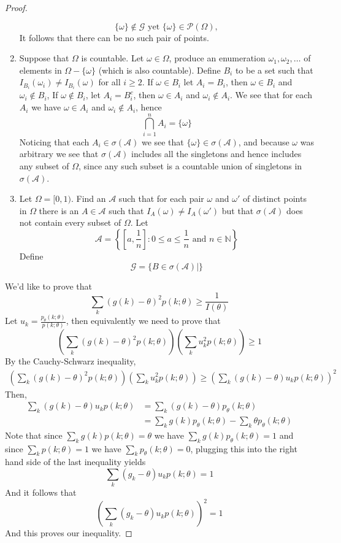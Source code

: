 \documentclass[12pt]{article}
\newcommand{\N}{\mathbb{N}}
\newcommand{\A}{\mathcal{A}}
\newcommand{\G}{\mathcal{G}}
\newcommand{\om}{\omega}
\newcommand{\Om}{\Omega}
\newcommand{\mc}{\mathcal}
\begin{document}
\begin{proof}
\begin{enumerate}
        \[ \{ \om \} \notin \G \text { yet } \{ \om \} \in \mc P (\Om), \]
        It follows that there can be no such pair of points.
        \item Suppose that $\Om$ is countable. Let $\om \in \Om$, produce an enumeration $\om_1, \om_2, \ldots$ of elements in $\Om - \{ \om \}$ (which is also countable). Define $B_{i}$ to be a set such that $I_{B_i} (\om_i) \neq I_{B_i} (\om)$ for all $i \geq 2$. If $\om \in B_i$ let $A_i = B_i$, then $\om \in B_i$ and $\om_i \notin B_i$, If $\om \notin B_i$, let $A_i = B_i^{c}$, then $\om \in A_i$ and $\om_i \notin A_i$. We see that for each $A_{i}$ we have $\om \in A_i$ and $\om_i \notin A_i$, hence
        \[ \bigcap_{i=1}^{n} A_i = \{ \om \} \]
        Noticing that each $A_i \in \sigma (\A)$ we see that $\{ \om \} \in \sigma (\A)$, and because $\om$ was arbitrary we see that $\sigma (\A)$ includes all the singletons and hence includes any subset of $\Om$, since any such subset is a countable union of singletons in $\sigma (\A)$. 
        \item Let $\Om = [0, 1)$. Find an $\A$ such that for each pair $\om$ and $\om'$ of distinct points in $\Om$ there is an $A \in \A$ such that $I_A (\om) \neq I_A (\om')$ but that $\sigma (\A)$ does not contain every subset of $\Om$. Let 
        \[ \A = \left \{ \left [a, \frac{1}{n} \right] : 0 \leq a \leq \frac{1}{n} \text { and } n \in \N \right \} \]
        Define
        \[ \G = \{ B \in \sigma (\A) \mid \} \]
    \end{enumerate}
    
    We'd like to prove that
    \[ \sum_{k} (g(k) - \theta)^2 p(k; \theta) \geq \frac{1}{I(\theta)} \]
    Let $u_k = \frac{p_{\theta} (k; \theta)}{p(k; \theta)}$, then equivalently we need to prove that
    \[ \left (\sum_{k} (g(k) - \theta)^2 p(k; \theta) \right ) \left (\sum_k u_k^2 p(k; \theta) \right ) \geq 1 \]
    By the Cauchy-Schwarz inequality,
    \begin{align*}
        \left (\sum_{k} (g(k) - \theta)^2 p(k; \theta) \right ) \left (\sum_k u_k^2 p(k; \theta) \right ) \geq \left (\sum_{k} (g(k) - \theta) u_k p(k; \theta) \right)^2
    \end{align*}
    Then,
    \begin{align*}
        \sum_{k} (g(k) - \theta) u_k p(k; \theta) &= \sum_{k} (g(k) - \theta) p_{\theta} (k; \theta) \\
        &= \sum_k g(k) p_{\theta} (k; \theta) - \sum_{k} \theta p_{\theta} (k; \theta)
    \end{align*}
    Note that since $\sum_k g(k) p(k; \theta) = \theta$ we have $\sum_k g(k) p_\theta (k;\theta) = 1$ and since $\sum_k p(k; \theta) = 1$ we have $\sum_k p_{\theta} (k; \theta) = 0$, plugging this into the right hand side of the last inequality yields
    \[ \sum_k (g_k - \theta) u_k p(k;\theta) = 1 \]
    And it follows that 
    \[ \left (\sum_k (g_k - \theta) u_k p(k; \theta) \right)^2 = 1 \]
    And this proves our inequality.
\end{proof}
\end{document}
